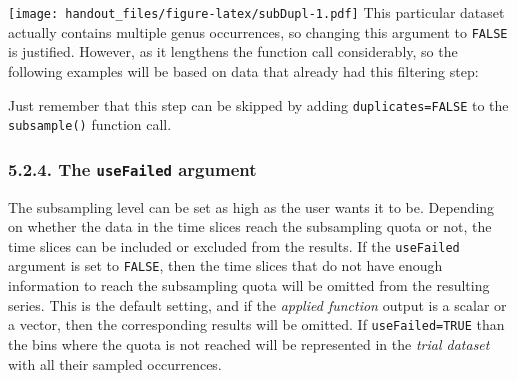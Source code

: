 \documentclass[]{article}
\newenvironment{Shaded}{\begin{snugshade}}{\end{snugshade}}
\newcommand{\CommentTok}[1]{\textcolor[rgb]{0.56,0.35,0.01}{\textit{#1}}}
\newcommand{\KeywordTok}[1]{\textcolor[rgb]{0.13,0.29,0.53}{\textbf{#1}}}
\newcommand{\NormalTok}[1]{#1}
\newcommand{\OperatorTok}[1]{\textcolor[rgb]{0.81,0.36,0.00}{\textbf{#1}}}
\newcommand{\StringTok}[1]{\textcolor[rgb]{0.31,0.60,0.02}{#1}}
\begin{document}
\texttt{[image: handout\_files/figure-latex/subDupl-1.pdf]} This
particular dataset actually contains multiple genus occurrences, so
changing this argument to \texttt{FALSE} is justified. However, as it
lengthens the function call considerably, so the following examples will
be based on data that already had this filtering step:

\begin{Shaded}
\end{Shaded}

Just remember that this step can be skipped by adding
\texttt{duplicates=FALSE} to the \texttt{subsample()} function call.

\hypertarget{the-usefailed-argument}{%
\subsubsection{\texorpdfstring{5.2.4. The \texttt{useFailed}
argument}{5.2.4. The useFailed argument}}\label{the-usefailed-argument}}

The subsampling level can be set as high as the user wants it to be.
Depending on whether the data in the time slices reach the subsampling
quota or not, the time slices can be included or excluded from the
results. If the \texttt{useFailed} argument is set to \texttt{FALSE},
then the time slices that do not have enough information to reach the
subsampling quota will be omitted from the resulting series. This is the
default setting, and if the \emph{applied function} output is a scalar
or a vector, then the corresponding results will be omitted. If
\texttt{useFailed=TRUE} than the bins where the quota is not reached
will be represented in the \emph{trial dataset} with all their sampled
occurrences.
\end{document}
